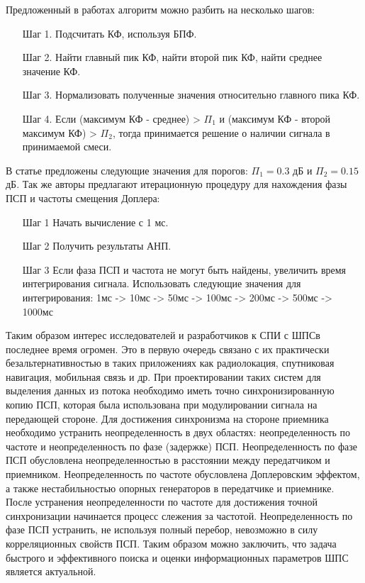Предложенный в работах алгоритм можно разбить на несколько шагов:
\begin{itemize}
	\item[Шаг 1.] Подсчитать КФ, используя БПФ.
	\item[Шаг 2.] Найти главный пик КФ, найти второй пик КФ, найти среднее значение КФ.
	\item[Шаг 3.] Нормализовать полученные значения относительно главного пика КФ.
	\item[Шаг 4.] Если (максимум КФ - среднее) > ${\Pi_1}$ и (максимум КФ - 
		второй максимум КФ) > ${\Pi_2}$, тогда принимается решение о наличии сигнала в принимаемой смеси. 
\end{itemize}

В статье \cite{2max_ieee} предложены следующие значения для порогов: ${\Pi_1} = 0.3$ дБ и  ${\Pi_2} = 0.15$ дБ.
Так же авторы предлагают итерационную процедуру для нахождения фазы ПСП и частоты смещения Доплера:
\begin{itemize}
	\item[Шаг 1] Начать вычисление с 1 мс.
	\item[Шаг 2] Получить результаты АНП.
	\item[Шаг 3] Если фаза ПСП и частота не могут быть найдены, увеличить время интегрирования сигнала.
		Использовать следующие значения для интегрирования: 1мс -> 10мс -> 50мс -> 100мс -> 200мс -> 500мс -> 1000мс
\end{itemize}

Таким образом интерес исследователей и разработчиков к СПИ с ШПСв последнее время огромен. Это в первую очередь связано с их
практически безальтернативностью  в таких приложениях как радиолокация, спутниковая навигация, мобильная связь и др. При проектировании таких систем
для выделения данных из потока необходимо иметь точно синхронизированную копию ПСП, которая была использована
при модулировании сигнала на передающей стороне. Для достижения синхронизма на стороне приемника необходимо
устранить неопределенность в двух областях: неопределенность по частоте и неопределенность по фазе (задержке) ПСП.
Неопределенность по фазе ПСП обусловлена неопределенностью в расстоянии между передатчиком и приемником. Неопределенность
по частоте обусловлена Доплеровским эффектом, а также нестабильностью опорных генераторов в
передатчике и приемнике. После устранения неопределенности по частоте для достижения точной синхронизации
начинается процесс слежения за частотой. Неопределенность по фазе ПСП устранить, не используя полный перебор,
невозможно в силу корреляционных свойств ПСП. Таким образом можно заключить, что задача быстрого и эффективного
поиска и оценки информационных параметров ШПС является актуальной.

